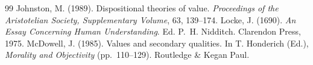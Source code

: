 \documentclass{situationist-preprint}
\begin{document}
\begin{thebibliography}{99}\small
{} Johnston, M. (1989). Dispositional theories of value. \emph{Proceedings of the Aristotelian Society, Supplementary Volume}, 63, 139--174.
 Locke, J. (1690). \emph{An Essay Concerning Human Understanding}. Ed. P.~H. Nidditch. Clarendon Press, 1975.
 McDowell, J. (1985). Values and secondary qualities. In T. Honderich (Ed.), \emph{Morality and Objectivity} (pp.~110--129). Routledge \& Kegan Paul.
\end{thebibliography}
\end{document}
